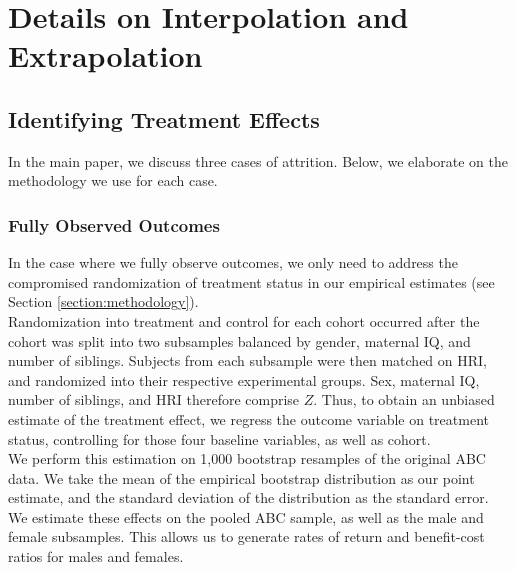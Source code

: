 \section{Details on Interpolation and Extrapolation} \label{appendix:methodology}

\subsection{Identifying Treatment Effects}
\label{app:method_identify}

\noindent In the main paper, we discuss three cases of attrition. Below, we elaborate on the methodology we use for each case. \\

\subsubsection{Fully Observed Outcomes}
\label{app:method_fullobs}

\noindent  In the case where we fully observe outcomes, we only need to address the compromised randomization
of treatment status in our empirical estimates (see Section \ref{section:methodology}). \\

\noindent Randomization into treatment and control for each cohort occurred after the cohort was split
into two subsamples balanced by gender, maternal IQ,
and number of siblings. Subjects from each subsample were then matched on HRI, and randomized
into their respective experimental groups. Sex, maternal IQ, number of siblings, and HRI
therefore comprise $Z$. Thus, to obtain an
unbiased estimate of the treatment effect, we regress the outcome variable on treatment status,
controlling for those four baseline variables, as well as cohort. \\

\noindent We perform this estimation on 1,000 bootstrap resamples of the original ABC data. We take the
mean of the empirical bootstrap distribution as our point estimate, and the standard deviation
of the distribution as the standard error. We estimate these effects on the
pooled ABC sample, as well as the male and female subsamples. This allows us to generate
rates of return and benefit-cost ratios for males and females. \\


